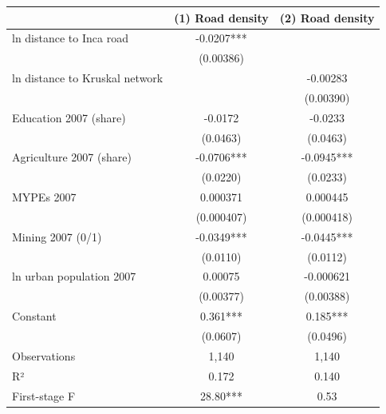 \begin{tabular}{lcc}
\hline
 & (1) Road density & (2) Road density \\
\hline
ln distance to Inca road & -0.0207*** &  \\
 & (0.00386) &  \\
ln distance to Kruskal network &  & -0.00283 \\
 &  & (0.00390) \\
Education 2007 (share) & -0.0172 & -0.0233 \\
 & (0.0463) & (0.0463) \\
Agriculture 2007 (share) & -0.0706*** & -0.0945*** \\
 & (0.0220) & (0.0233) \\
MYPEs 2007 & 0.000371 & 0.000445 \\
 & (0.000407) & (0.000418) \\
Mining 2007 (0/1) & -0.0349*** & -0.0445*** \\
 & (0.0110) & (0.0112) \\
ln urban population 2007 & 0.00075 & -0.000621 \\
 & (0.00377) & (0.00388) \\
Constant & 0.361*** & 0.185*** \\
 & (0.0607) & (0.0496) \\
Observations & 1,140 & 1,140 \\
R² & 0.172 & 0.140 \\
First-stage F & 28.80*** & 0.53 \\
\hline
\end{tabular}
